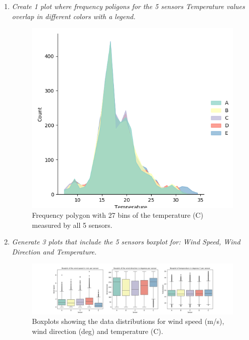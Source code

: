 \documentclass[a4paper,12pt]{article} %
\begin{document}
\begin{enumerate}
\item {\it Create 1 plot where frequency poligons for the 5 sensors Temperature values overlap in different colors with a legend.}

 \begin{figure}[H] 
    \centering
    \includegraphics[scale=0.6]{polygon hist temperature.png} 
    \caption{Frequency polygon with 27 bins of the temperature (\degree C) measured by all 5 sensors.} %
    \label{fig:freqpoly}
  \end{figure}



\item {\it Generate 3 plots that include the 5 sensors boxplot for: Wind Speed, Wind Direction and Temperature.}

 \begin{figure}[H] 
    \centering
    \includegraphics[width=1\textwidth]{Boxplots.png} 
    \caption{Boxplots showing the data distributions for wind speed (m/s), wind direction (deg) and temperature (\degree C).} 
    \label{fig:boxplots}
  \end{figure} 


\end{enumerate}
\end{document}
